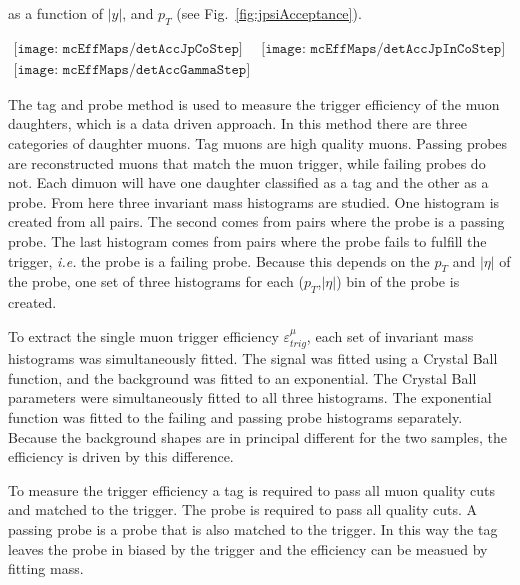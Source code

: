         as a function of $|y|$, and $p_{T}$ (see Fig.~\ref{fig:jpsiAcceptance}).
        \begin{figure*}[!Hhtb]
          \centering
          $ \begin{array}{cc}
            \texttt{[image: mcEffMaps/detAccJpCoStep]} &
            \texttt{[image: mcEffMaps/detAccJpInCoStep]} \\
            \texttt{[image: mcEffMaps/detAccGammaStep]}
          \end{array} $
          \caption{Dimuon acceptance from coherent J/$\psi$ (top left), incoherent 
            J$\psi$ (top right), and photon-photon interactions (lower).}
          \label{fig:jpsiAcceptance}
        \end{figure*}

      The tag and probe method is used to measure the trigger efficiency of 
        the muon daughters, which is a data driven approach. 
      In this method there are three categories of daughter muons. 
      Tag muons are high quality muons.
      Passing probes are reconstructed muons that match the muon trigger, 
        while failing probes do not. 
      Each dimuon will have one daughter classified as a tag and the other
        as a probe.
      From here three invariant mass histograms are studied. 
      One histogram is created from all pairs. 
      The second comes from pairs where the probe is a passing probe.  
      The last histogram comes from pairs where the probe fails to fulfill
        the trigger, \textit{i.e.} the probe is a failing probe. 
      Because this depends on the $p_{T}$ and $|\eta|$ of the probe, one set 
        of three histograms for each ($p_{T}$,$|\eta|$) bin of the probe is 
        created.

      To extract the single muon trigger efficiency $\varepsilon^{\mu}_{trig}$, 
        each set of invariant mass histograms was simultaneously fitted. 
      The signal was fitted using a Crystal Ball function, and the background 
        was fitted to an exponential.
      The Crystal Ball parameters were simultaneously fitted to all three 
        histograms.
      The exponential function was fitted to the failing and passing probe 
        histograms separately.
      Because the background shapes are in principal different for the two 
        samples, the efficiency is driven by this difference. 

      To measure the trigger efficiency a tag is required to pass all muon
        quality cuts and matched to the trigger.
      The probe is required to pass all quality cuts. 
      A passing probe is a probe that is also matched to the trigger. 
      In this way the tag leaves the probe in biased by the trigger and the 
        efficiency can be measued by fitting mass.  

